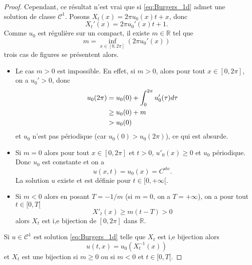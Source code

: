 \begin{proof}
Cependant, ce résultat n'est vrai que si \eqref{eq:Burgers_1d} admet une solution de classe $\mathcal{C}^1$.
Posons $X_t(x) = 2 \pi u_0(x)t + x$, donc
\begin{equation}
X_t'(x) = 2 \pi u_0'(x) t + 1.
\end{equation}
Comme $u_0$ est régulière sur un compact, il existe $m \in \mathbb{R}$ tel que
\begin{equation}
m = \inf_{x \in [0, 2 \pi]} \left( 2 \pi u_0'(x) \right)
\end{equation}
trois cas de figures se présentent alors.
\begin{itemize}
\item Le cas $m > 0$ est impossible. En effet, si $m>0$, alors pour tout $x \in [0, 2\pi]$, on a $u_0' >0$, donc
\begin{align*}
u_0(2 \pi) & = u_0(0) + \displaystyle\int_0^{2 \pi} u_0'(\tau) d \tau \\
	& \geq u_0(0) + m \\
	& > u_0(0)
\end{align*}
et $u_0$ n'est pas périodique (car $u_0(0)>u_0(2 \pi)$), ce qui est absurde.

\item Si $m=0$ alors pour tout $x \in [0, 2 \pi]$ et $t>0$, $u'_0(x) \geq 0$ et $u_0$ périodique. Donc $u_0$ est constante et on a
\begin{equation}
u(x,t) = u_0(x) = C^{\text{ste}}.
\end{equation}
La solution $u$ existe et est définie pour $t \in [0 , + \infty[$.

\item Si $m < 0$ alors en posant $T = -1/m$ (si $m=0$, on a $T = + \infty$), on a pour tout $t \in [0, T[$
\begin{equation}
X'_t(x) \geq m(t-T) > 0
\end{equation}
alors $X_t$ est i,e bijection de $[0, 2 \pi]$ dans $\mathbb{R}$.
\end{itemize}

Si $u \in \mathcal{C}^1$ est solution \eqref{eq:Burgers_1d} telle que $X_t$ est i,e bijection alors
\begin{equation}
u(t,x) = u_0(X_t^{-1}(x))
\end{equation}
et $X_t$ est une bijection si $m \geq 0$ ou si $m<0$ et $t \in [0, T[$.


\end{proof}
